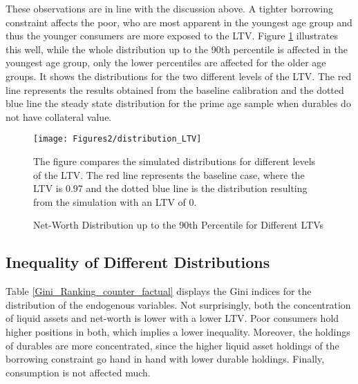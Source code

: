 \documentclass[a4paper,12pt,legno]{article}
\begin{document}
These observations are in line with the discussion above. A tighter borrowing constraint affects the poor, who are most apparent in the youngest age group and thus the younger consumers are more exposed to the LTV. Figure \ref{downpayment_vs_baseline} illustrates this well, while the whole distribution up to the 90th percentile is affected in the youngest age group, only the lower percentiles are affected for the older age groups. It shows the distributions for the two different levels of the LTV. The red line represents the results obtained from the baseline calibration and the dotted blue line the steady state distribution for the prime age sample when durables do not have collateral value. 

\begin{figure}[!htbp]
\caption{Net-Worth Distribution up to the 90th Percentile for Different LTVs} 
\label{downpayment_vs_baseline}	%
\centering
\texttt{[image: Figures2/distribution\_LTV]}  %

\begin{minipage}{0.8\linewidth}
\footnotesize{The figure compares the simulated distributions for different levels of the LTV. The red line represents the baseline case, where the LTV is 0.97 and the dotted blue line is the distribution resulting from the simulation with an LTV of 0.}
\end{minipage}

\end{figure}

\subsection{Inequality of Different Distributions}
Table \ref{Gini_Ranking_counter_factual} displays the Gini indices for the distribution of the endogenous variables. Not surprisingly, both the concentration of liquid assets and net-worth is lower with a lower LTV. Poor consumers hold higher positions in both, which implies a lower inequality. Moreover, the holdings of durables are more concentrated, since the higher liquid asset holdings of the borrowing constraint go hand in hand with lower durable holdings. Finally, consumption is not affected much.  
\end{document}
